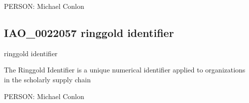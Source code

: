 \documentclass[letterpaper,10pt,english]{sphinxmanual}
\begin{document}
\begin{sphinxShadowBox}

\sphinxAtStartPar
PERSON: Michael Conlon
\end{sphinxShadowBox}
\begin{quote}

\ignorespaces \end{quote}


\subsection{IAO\_0022057 \sphinxhyphen{} ringgold identifier}
\label{\detokenize{doc-IAO_0022057:iao-0022057-ringgold-identifier}}\label{\detokenize{doc-IAO_0022057:index-0}}\label{\detokenize{doc-IAO_0022057::doc}}
\begin{sphinxShadowBox}

\sphinxAtStartPar
ringgold identifier
\end{sphinxShadowBox}

\begin{sphinxShadowBox}

\sphinxAtStartPar
The Ringgold Identifier is a unique numerical identifier applied to organizations in the scholarly supply chain
\end{sphinxShadowBox}

\begin{sphinxShadowBox}

\sphinxAtStartPar
{}
\end{sphinxShadowBox}

\begin{sphinxShadowBox}

\sphinxAtStartPar
{}
\end{sphinxShadowBox}

\begin{sphinxShadowBox}

\sphinxAtStartPar
PERSON: Michael Conlon
\end{sphinxShadowBox}
\begin{quote}

\ignorespaces \end{quote}
\end{document}
